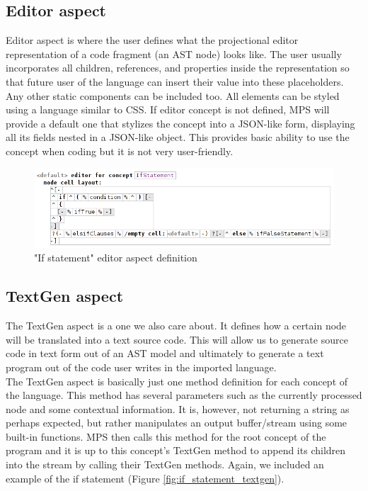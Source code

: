 \subsection{Editor aspect}
\label{chap:about_editor_aspect}

Editor aspect is where the user defines what the projectional editor representation of a code fragment (an AST node) looks like.
The user usually incorporates all children, references, and properties inside the representation so that future user of the language can insert their value into these placeholders.
Any other static components can be included too.
All elements can be styled using a language similar to CSS.
If editor concept is not defined, MPS will provide a default one that stylizes the concept into a JSON-like form, displaying all its fields nested in a JSON-like object.
This provides basic ability to use the concept when coding but it is not very user-friendly.

\begin{figure}[h]
	\centering
	\includegraphics[width=\textwidth]{./img/if_statement_editor_definition.png}
	\caption{"If statement" editor aspect definition}
	\label{fig:if_editor_definition}
\end{figure}

\subsection{TextGen aspect}
The TextGen aspect is a one we also care about.
It defines how a certain node will be translated into a text source code.
This will allow us to generate source code in text form out of an AST model and ultimately to generate a text program out of the code user writes in the imported language.
\\

The TextGen aspect is basically just one method definition for each concept of the language.
This method has several parameters such as the currently processed node and some contextual information.
It is, however, not returning a string as perhaps expected, but rather manipulates an output buffer/stream using some built-in functions.
MPS then calls this method for the root concept of the program and it is up to this concept's TextGen method to append its children into the stream by calling their TextGen methods.
Again, we included an example of the if statement (Figure \ref{fig:if_statement_textgen}).

